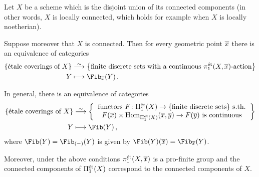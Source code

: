 \begin{thm}\label{thm:GrothendieckGalois}
	Let $X$ be a scheme which is the disjoint union of its connected components (in other words, $X$ is locally connected, which holds for example when $X$ is locally noetherian).
	\begin{alphanumerate}
		\item Suppose moreover that $X$ is connected. Then for every geometric point $\ov{x}$ there is an equivalence of categories
		\begin{align*}
			\left\{\text{étale coverings of $X$}\right\}&\isomorphism \left\{\text{finite discrete sets with a continuous $\pi_1^\et(X,\ov{x})$-action}\right\}\\
			Y&\longmapsto \Fib_{\ov{x}}(Y)\,.
		\end{align*}
		\item In general, there is an equivalence of categories
		\begin{align*}
		\left\{\text{étale coverings of $X$}\right\}&\isomorphism\left\{\begin{tabular}{c}
		functors $F\colon \Pi_1^\et(X)\rightarrow\{\text{finite discrete sets}\}$ s.th.\\
		$F(\ov{x})\times \Hom_{\Pi_1^\et(X)}(\ov{x},\ov{y})\rightarrow F(\ov{y})$ is continuous
		\end{tabular}\right\}\\
		Y&\longmapsto \Fib(Y)\,,
		\end{align*}
		where $\Fib(Y)=\Fib_{(-)}(Y)$ is given by $\Fib(Y)(\ov{x})=\Fib_{\ov{x}}(Y)$.
	\end{alphanumerate}
	Moreover, under the above conditions $\pi_1^\et(X,\ov{x})$ is a pro-finite group and the connected components of $\Pi_1^{\mathrm{\acute{e}t}}(X)$ correspond to the connected components of $X$.
\end{thm}

